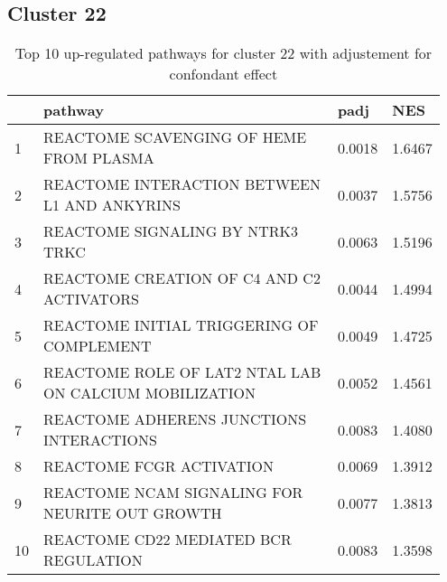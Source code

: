 \documentclass{article}
\begin{document}
\subsection{Cluster 22 }
\begin{table}[H]
\centering
\begin{tabular}{p{0.05\linewidth}p{0.7\linewidth}p{0.1\linewidth}p{0.1\linewidth}}
  \hline
 & pathway & padj & NES \\ 
  \hline
1 & REACTOME SCAVENGING OF HEME FROM PLASMA & 0.0018 & 1.6467 \\ 
  2 & REACTOME INTERACTION BETWEEN L1 AND ANKYRINS & 0.0037 & 1.5756 \\ 
  3 & REACTOME SIGNALING BY NTRK3 TRKC & 0.0063 & 1.5196 \\ 
  4 & REACTOME CREATION OF C4 AND C2 ACTIVATORS & 0.0044 & 1.4994 \\ 
  5 & REACTOME INITIAL TRIGGERING OF COMPLEMENT & 0.0049 & 1.4725 \\ 
  6 & REACTOME ROLE OF LAT2 NTAL LAB ON CALCIUM MOBILIZATION & 0.0052 & 1.4561 \\ 
  7 & REACTOME ADHERENS JUNCTIONS INTERACTIONS & 0.0083 & 1.4080 \\ 
  8 & REACTOME FCGR ACTIVATION & 0.0069 & 1.3912 \\ 
  9 & REACTOME NCAM SIGNALING FOR NEURITE OUT GROWTH & 0.0077 & 1.3813 \\ 
  10 & REACTOME CD22 MEDIATED BCR REGULATION & 0.0083 & 1.3598 \\ 
   \hline
\end{tabular}
\caption{Top 10 up-regulated pathways for cluster 22 with adjustement for confondant effect} 
\label{tab:q3_2_conf_22}
\end{table}
\end{document}
